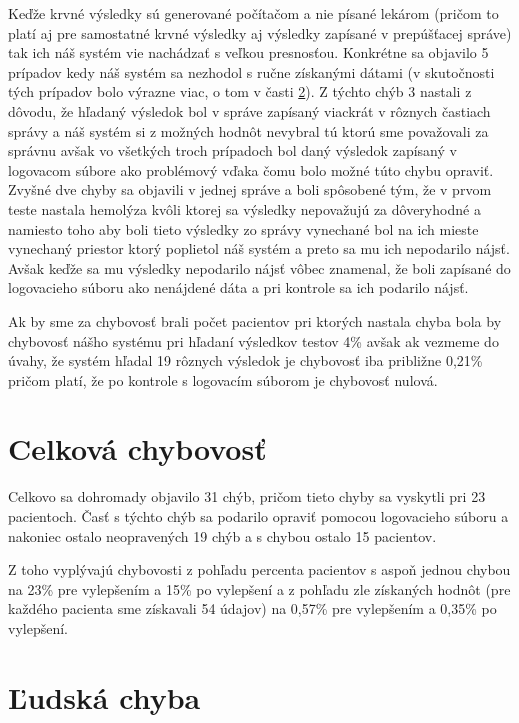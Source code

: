 Keďže krvné výsledky sú generované počítačom a nie písané lekárom (pričom to platí aj pre samostatné krvné výsledky aj výsledky zapísané v prepúšťacej správe) tak ich náš systém vie nachádzať s veľkou presnosťou. Konkrétne sa objavilo 5 prípadov kedy náš systém sa nezhodol s ručne získanými dátami (v skutočnosti tých prípadov bolo výrazne viac, o tom v časti \ref{ludChyba}). Z týchto chýb 3 nastali z dôvodu, že hľadaný výsledok bol v správe zapísaný viackrát v rôznych častiach správy a náš systém si z možných hodnôt nevybral tú ktorú sme považovali za správnu avšak vo všetkých troch prípadoch bol daný výsledok zapísaný v logovacom súbore ako problémový vďaka čomu bolo možné túto chybu opraviť. Zvyšné dve chyby sa objavili v jednej správe a boli spôsobené tým, že v prvom teste nastala hemolýza kvôli ktorej sa výsledky nepovažujú za dôveryhodné a namiesto toho aby boli tieto výsledky zo správy vynechané bol na ich mieste vynechaný priestor ktorý poplietol náš systém a preto sa mu ich nepodarilo nájsť. Avšak keďže sa mu výsledky nepodarilo nájsť vôbec znamenal, že boli zapísané do logovacieho súboru ako nenájdené dáta a pri kontrole sa ich podarilo nájsť.

Ak by sme za chybovosť brali počet pacientov pri ktorých nastala chyba bola by chybovosť nášho systému pri hľadaní výsledkov testov 4\% avšak ak vezmeme do úvahy, že systém hľadal 19 rôznych výsledok je chybovosť iba približne 0,21\% pričom platí, že po kontrole s logovacím súborom je chybovosť nulová.

\section{Celková chybovosť}

Celkovo sa dohromady objavilo 31 chýb, pričom tieto chyby sa vyskytli pri 23 pacientoch. Časť s týchto chýb sa podarilo opraviť pomocou logovacieho súboru a nakoniec ostalo neopravených 19 chýb a s chybou ostalo 15 pacientov.

Z toho vyplývajú chybovosti z pohľadu percenta pacientov s aspoň jednou chybou na 23\% pre vylepšením a 15\% po vylepšení a z pohľadu zle získaných hodnôt (pre každého pacienta sme získavali 54 údajov) na 0,57\% pre vylepšením a 0,35\% po vylepšení.

\section{Ľudská chyba}
\label{ludChyba}

